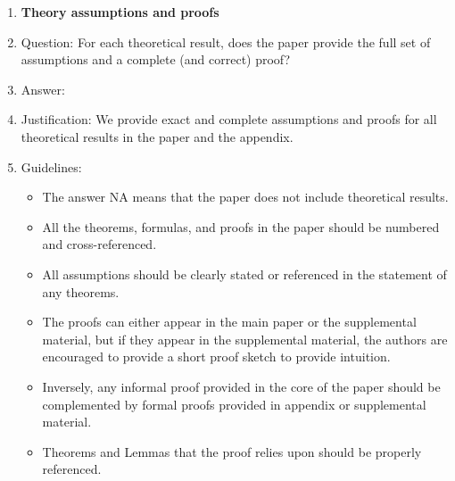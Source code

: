 \documentclass{article}
\begin{document}
\begin{enumerate}
\item {\bf Theory assumptions and proofs}
    \item[] Question: For each theoretical result, does the paper provide the full set of assumptions and a complete (and correct) proof?
    \item[] Answer: \answerYes{} %
    \item[] Justification: We provide exact and complete assumptions and proofs for all theoretical results in the paper and the appendix.
    \item[] Guidelines:
    \begin{itemize}
        \item The answer NA means that the paper does not include theoretical results. 
        \item All the theorems, formulas, and proofs in the paper should be numbered and cross-referenced.
        \item All assumptions should be clearly stated or referenced in the statement of any theorems.
        \item The proofs can either appear in the main paper or the supplemental material, but if they appear in the supplemental material, the authors are encouraged to provide a short proof sketch to provide intuition. 
        \item Inversely, any informal proof provided in the core of the paper should be complemented by formal proofs provided in appendix or supplemental material.
        \item Theorems and Lemmas that the proof relies upon should be properly referenced. 
    \end{itemize}


\end{enumerate}
\end{document}
